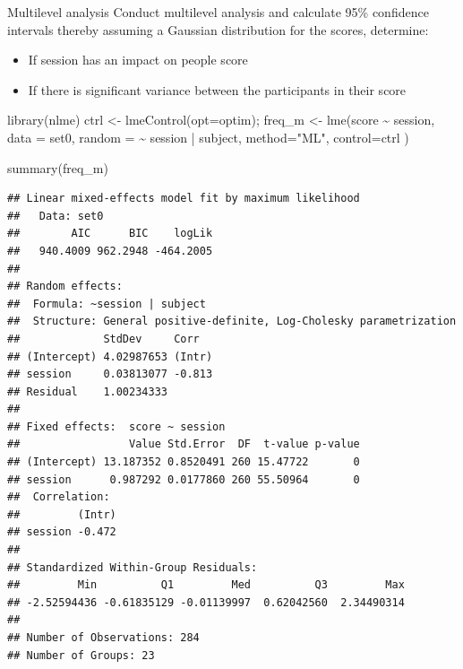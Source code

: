 \documentclass[
  ignorenonframetext,
]{beamer}
\newenvironment{Shaded}{\begin{snugshade}}{\end{snugshade}}
\newcommand{\AttributeTok}[1]{\textcolor[rgb]{0.77,0.63,0.00}{#1}}
\newcommand{\FunctionTok}[1]{\textcolor[rgb]{0.00,0.00,0.00}{#1}}
\newcommand{\NormalTok}[1]{#1}
\newcommand{\OtherTok}[1]{\textcolor[rgb]{0.56,0.35,0.01}{#1}}
\newcommand{\SpecialCharTok}[1]{\textcolor[rgb]{0.00,0.00,0.00}{#1}}
\newcommand{\StringTok}[1]{\textcolor[rgb]{0.31,0.60,0.02}{#1}}
\providecommand{\tightlist}{%
  \setlength{\itemsep}{0pt}\setlength{\parskip}{0pt}}
\begin{document}
\begin{frame}[fragile]{Multilevel analysis}
\protect\hypertarget{multilevel-analysis}{}
Conduct multilevel analysis and calculate 95\% confidence intervals
thereby assuming a Gaussian distribution for the scores, determine:

\begin{itemize}
\tightlist
\item
  If session has an impact on people score
\item
  If there is significant variance between the participants in their
  score
\end{itemize}

\begin{Shaded}
\begin{Highlighting}[]
\FunctionTok{library}\NormalTok{(nlme)}
\NormalTok{ctrl }\OtherTok{\textless{}{-}} \FunctionTok{lmeControl}\NormalTok{(}\AttributeTok{opt=}\StringTok{\textquotesingle{}optim\textquotesingle{}}\NormalTok{);}
\NormalTok{freq\_m }\OtherTok{\textless{}{-}} \FunctionTok{lme}\NormalTok{(score }\SpecialCharTok{\textasciitilde{}}\NormalTok{ session,}
          \AttributeTok{data =}\NormalTok{ set0,}
          \AttributeTok{random =} \SpecialCharTok{\textasciitilde{}}\NormalTok{ session }\SpecialCharTok{|}\NormalTok{ subject,}
          \AttributeTok{method=}\StringTok{"ML"}\NormalTok{,}
          \AttributeTok{control=}\NormalTok{ctrl}
\NormalTok{          )}

\FunctionTok{summary}\NormalTok{(freq\_m)}
\end{Highlighting}
\end{Shaded}

\begin{verbatim}
## Linear mixed-effects model fit by maximum likelihood
##   Data: set0 
##        AIC      BIC    logLik
##   940.4009 962.2948 -464.2005
## 
## Random effects:
##  Formula: ~session | subject
##  Structure: General positive-definite, Log-Cholesky parametrization
##             StdDev     Corr  
## (Intercept) 4.02987653 (Intr)
## session     0.03813077 -0.813
## Residual    1.00234333       
## 
## Fixed effects:  score ~ session 
##                 Value Std.Error  DF  t-value p-value
## (Intercept) 13.187352 0.8520491 260 15.47722       0
## session      0.987292 0.0177860 260 55.50964       0
##  Correlation: 
##         (Intr)
## session -0.472
## 
## Standardized Within-Group Residuals:
##         Min          Q1         Med          Q3         Max 
## -2.52594436 -0.61835129 -0.01139997  0.62042560  2.34490314 
## 
## Number of Observations: 284
## Number of Groups: 23
\end{verbatim}


\end{frame}
\end{document}
